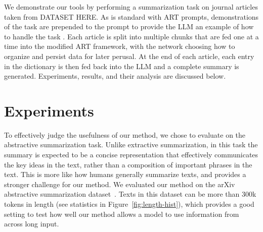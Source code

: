 \documentclass{article}
\begin{document}
We demonstrate our tools by performing a summarization task on journal articles taken from DATASET HERE.
As is standard with ART prompts, demonstrations of the task are prepended to the prompt to provide the LLM an example of how to handle the task \cite{paranjape2023art}.
Each article is split into multiple chunks that are fed one at a time into the modified ART framework, with the network choosing how to organize and persist data for later perusal.
At the end of each article, each entry in the dictionary is then fed back into the LLM and a complete summary is generated. Experiments, results, and their analysis are discussed below.

\section{Experiments}\label{section:experiments}

To effectively judge the usefulness of our method, we chose to evaluate on the abstractive summarization task. Unlike extractive summarization, in this task the summary is expected to be a concise representation that effectively communicates the key ideas in the text, rather than a composition of important phrases in the text. This is more like how humans generally summarize texts, and provides a stronger challenge for our method. We evaluated our method on the arXiv abstractive summarization dataset~\cite{cohan-etal-2018-discourse}. Texts in this dataset can be more than 300k tokens in length (see statistics in Figure~\ref{fig:length-hist}), which provides a good setting to test how well our method allows a model to use information from across long input.
\end{document}
